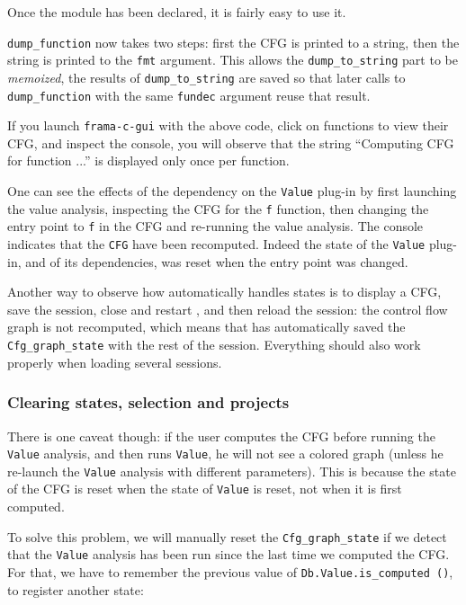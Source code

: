 Once the module has been declared, it is fairly easy to use it.


\texttt{dump\_function} now takes two steps: first the CFG is printed
to a string, then the string is printed to the \texttt{fmt}
argument. This allows the \texttt{dump\_to\_string} part to be
\emph{memoized}, \ie the results of \texttt{dump\_to\_string} are
saved so that later calls to \texttt{dump\_function} with the same
\texttt{fundec} argument reuse that result. 

If you launch \texttt{frama-c-gui} with the above code, click on
functions to view their CFG, and inspect the console, you will observe
that the string ``Computing CFG for function ...'' is displayed only
once per function.

One can see the effects of the dependency on the \texttt{Value} plug-in
by first launching the value analysis, inspecting the CFG for the
\texttt{f} function, then changing the entry point to \texttt{f} in the
CFG and re-running the value analysis. The console indicates that the
\texttt{CFG} have been recomputed. Indeed the state of the
\texttt{Value} plug-in, and of its dependencies, was reset when the
entry point was changed.

Another way to observe how \framac automatically handles states is to display a
CFG, save the session, close and restart \framac, 
and then reload the session: the control flow graph is not recomputed,
which means that \framac has automatically saved the
\texttt{Cfg\_graph\_state} with the rest of the session. Everything
should also work properly when loading several sessions.

\subsubsection{Clearing states, selection and projects}

There is one caveat though: if the user computes the CFG before
running the \texttt{Value} analysis, and then runs \texttt{Value}, he
will not see a colored graph (unless he re-launch the \texttt{Value}
analysis with different parameters). This is because the state of the
CFG is reset when the state of \texttt{Value} is reset, not when it is
first computed.

To solve this problem, we will manually reset the
\texttt{Cfg\_graph\_state} if we detect that the \texttt{Value}
analysis has been run since the last time we computed the CFG. For
that, we have to remember the previous value of
\texttt{Db.Value.is\_computed ()}, \ie to register another state:

